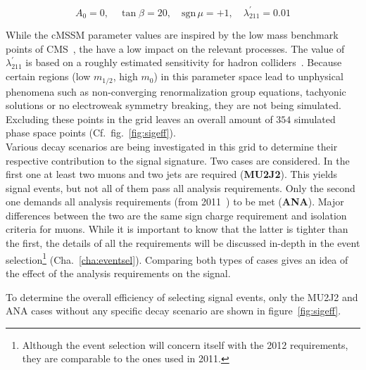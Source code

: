 \begin{equation*}
  A_0 = 0, \quad \tan{\beta} = 20, \quad \text{sgn}\,\mu = +1, \quad \lambda^\prime_{211} = 0.01
\end{equation*}

While the cMSSM parameter values are inspired by the low mass benchmark points of CMS~\cite{cmssusybenchmarkpoints}, the have a low impact on the relevant processes. The value of $\lambda^\prime_{211}$ is based on a roughly estimated sensitivity for hadron colliders~\cite{rpvimpl}. Because certain regions (low $m_{1/2}$, high $m_0$) in this parameter space lead to unphysical phenomena such as non-converging renormalization group equations, tachyonic solutions or no electroweak symmetry breaking, they are not being simulated. Excluding these points in the grid leaves an overall amount of $354$ simulated phase space points (Cf.~fig.~\ref{fig:sigeff}). \\

Various decay scenarios are being investigated in this grid to determine their respective contribution to the signal signature. Two cases are considered. In the first one at least two muons and two jets are required (\textbf{MU2J2}). This yields signal events, but not all of them pass all analysis requirements. Only the second one demands all analysis requirements (from 2011~\cite{2011rpv}) to be met (\textbf{ANA}). Major differences between the two are the same sign charge requirement and isolation criteria for muons. While it is important to know that the latter is tighter than the first, the details of all the requirements will be discussed in-depth in the event selection\footnote{Although the event selection will concern itself with the 2012 requirements, they are comparable to the ones used in 2011.} (Cha.~\ref{cha:eventsel}). Comparing both types of cases gives an idea of the effect of the analysis requirements on the signal.

To determine the overall efficiency of selecting signal events, only the MU2J2 and ANA cases without any specific decay scenario are shown in figure~\ref{fig:sigeff}.

